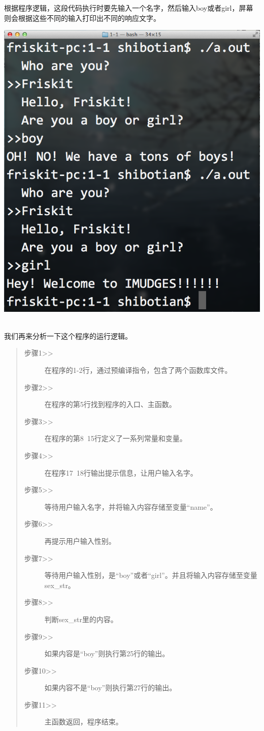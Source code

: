 根据程序逻辑，这段代码执行时要先输入一个名字，然后输入boy或者girl，屏幕则会根据这些不同的输入打印出不同的响应文字。
\\[\intextsep] 
  \begin{minipage}{\textwidth} 
    \centering 
    \includegraphics{codes/1-1/result.png}
    \label{fig:code-1-1-result} 
  \end{minipage} 
\\[\intextsep] 

我们再来分析一下这个程序的运行逻辑。
\begin{quote}
	\begin{description}
		\item[步骤1>>]在程序的1-2行，通过预编译指令，包含了两个函数库文件。
		\item[步骤2>>]在程序的第5行找到程序的入口、主函数。
		\item[步骤3>>]在程序的第8~15行定义了一系列常量和变量。
		\item[步骤4>>]在程序17~18行输出提示信息，让用户输入名字。
		\item[步骤5>>]等待用户输入名字，并将输入内容存储至变量“name”。
		\item[步骤6>>]再提示用户输入性别。
		\item[步骤7>>]等待用户输入性别，是“boy”或者“girl”。并且将输入内容存储至变量sex\_str。
		\item[步骤8>>]判断sex\_str里的内容。
		\item[步骤9>>]如果内容是“boy”则执行第25行的输出。
		\item[步骤10>>]如果内容不是“boy”则执行第27行的输出。
		\item[步骤11>>]主函数返回，程序结束。
	\end{description}
\end{quote}

